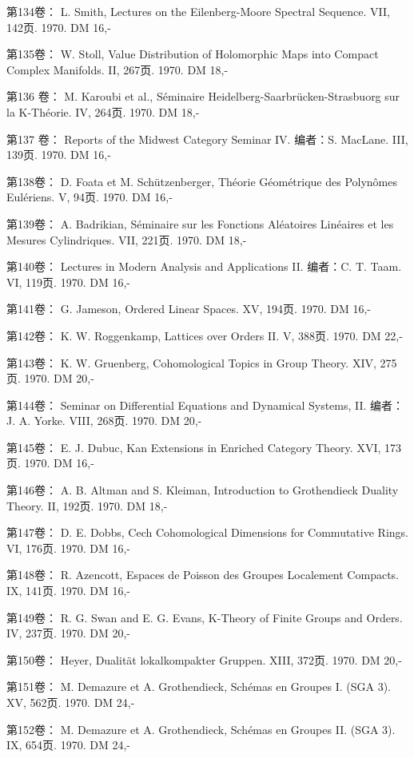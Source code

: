 第134卷： L. Smith, Lectures on the Eilenberg-Moore Spectral Sequence. VII, 142页. 1970. DM 16,-

第135卷： W. Stoll, Value Distribution of Holomorphic Maps into Compact Complex Manifolds. II, 267页. 1970. DM 18,-

第136 卷： M. Karoubi et al., Séminaire Heidelberg-Saarbrücken-Strasbuorg sur la K-Théorie. IV, 264页. 1970. DM 18,-

第137 卷： Reports of the Midwest Category Seminar IV. 编者：S. MacLane. III, 139页. 1970. DM 16,-

第138卷： D. Foata et M. Schützenberger, Théorie Géométrique des Polynômes Eulériens. V, 94页. 1970. DM 16,-

第139卷： A. Badrikian, Séminaire sur les Fonctions Aléatoires Linéaires et les Mesures Cylindriques. VII, 221页. 1970. DM 18,-

第140卷： Lectures in Modern Analysis and Applications II. 编者：C. T. Taam. VI, 119页. 1970. DM 16,-

第141卷： G. Jameson, Ordered Linear Spaces. XV, 194页. 1970. DM 16,-

第142卷： K. W. Roggenkamp, Lattices over Orders II. V, 388页. 1970. DM 22,-

第143卷： K. W. Gruenberg, Cohomological Topics in Group Theory. XIV, 275页. 1970. DM 20,-

第144卷： Seminar on Differential Equations and Dynamical Systems, II. 编者：J. A. Yorke. VIII, 268页. 1970. DM 20,-

第145卷： E. J. Dubuc, Kan Extensions in Enriched Category Theory. XVI, 173页. 1970. DM 16,-

第146卷： A. B. Altman and S. Kleiman, Introduction to Grothendieck Duality Theory. II, 192页. 1970. DM 18,-

第147卷： D. E. Dobbs, Cech Cohomological Dimensions for Commutative Rings. VI, 176页. 1970. DM 16,-

第148卷： R. Azencott, Espaces de Poisson des Groupes Localement Compacts. IX, 141页. 1970. DM 16,-

第149卷： R. G. Swan and E. G. Evans, K-Theory of Finite Groups and Orders. IV, 237页. 1970. DM 20,-

第150卷： Heyer, Dualität lokalkompakter Gruppen. XIII, 372页. 1970. DM 20,-

第151卷： M. Demazure et A. Grothendieck, Schémas en Groupes I. (SGA 3). XV, 562页. 1970. DM 24,-

第152卷： M. Demazure et A. Grothendieck, Schémas en Groupes II. (SGA 3). IX, 654页. 1970. DM 24,-

